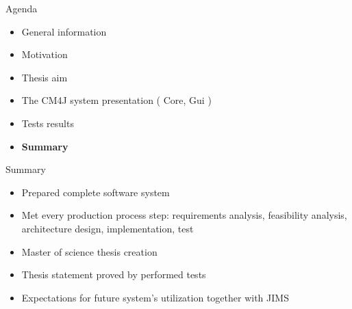 \documentclass{beamer}
\begin{document}
	\begin{frame}{Agenda}

		\begin{itemize}
			\item General information
			\item Motivation
			\item Thesis aim
			\item The CM4J system presentation ( Core, Gui )
			\item Tests results
			\item \textbf{Summary}
		\end{itemize}

	\end{frame}

	\begin{frame}{Summary}

		
		\begin{itemize}
			\item Prepared complete software system 
			\item Met every production process step: requirements analysis, feasibility analysis, architecture design, implementation, test
			\item Master of science thesis creation
			\item Thesis statement proved by performed tests
			\item Expectations for future system's utilization together with JIMS
		\end{itemize}

	\end{frame}
\end{document}
